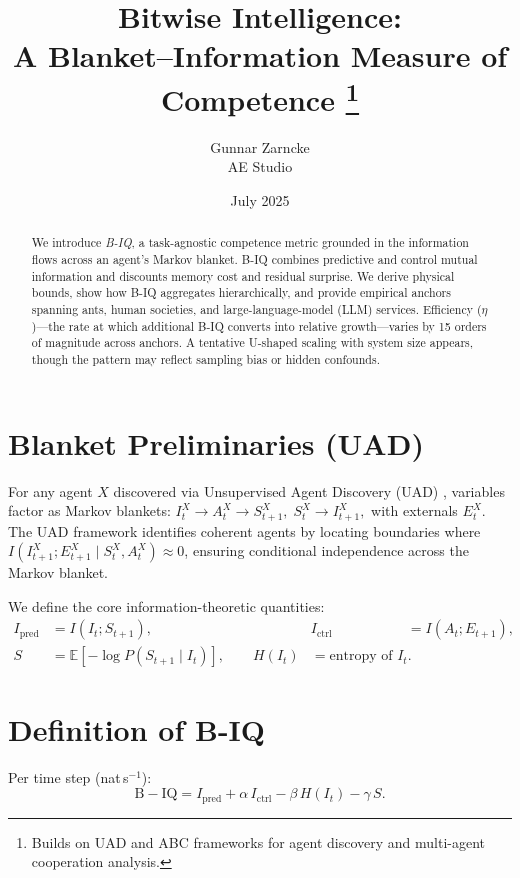 \documentclass[10pt,conference]{IEEEtran}
\title{Bitwise Intelligence:\\A Blanket–Information Measure of Competence
\thanks{\hspace{1em}Builds on UAD \cite{uad2025} and ABC \cite{abc2025} frameworks for agent discovery and multi-agent cooperation analysis.}}
\author{Gunnar Zarncke\\
AE Studio}
\date{July 2025}
\begin{document}
\maketitle

\begin{abstract}
We introduce \emph{B-IQ}, a task-agnostic competence metric grounded in the information flows across an agent's Markov blanket.  
B-IQ combines predictive and control mutual information and discounts memory cost and residual surprise.  
We derive physical bounds, show how B-IQ aggregates hierarchically, and provide empirical anchors spanning ants, human societies, and large-language-model (LLM) services.  
Efficiency (\(\eta\))—the rate at which additional B-IQ converts into relative growth—varies by 15 orders of magnitude across anchors.  
A tentative U-shaped scaling with system size appears, though the pattern may reflect sampling bias or hidden confounds.
\end{abstract}

\section{Blanket Preliminaries (UAD)}
For any agent \(X\) discovered via Unsupervised Agent Discovery (UAD) \cite{uad2025}, variables factor as Markov blankets:
\(
I^X_t\!\to\!A^X_t\!\to\!S^X_{t+1},
\;
S_t^X\!\to\!I^X_{t+1},
\)
with externals \(E^X_t\). The UAD framework identifies coherent agents by locating boundaries where \(I(I^X_{t+1};E^X_{t+1}\mid S^X_t,A^X_t) \approx 0\), ensuring conditional independence across the Markov blanket.

We define the core information-theoretic quantities:
\begin{align}
I_{\mathrm{pred}} &= I(I_t;S_{t+1}), &
I_{\mathrm{ctrl}} &= I(A_t;E_{t+1}),\nonumber\\
S &= \mathbb E[-\!\log P(S_{t+1}\!\mid I_t)],\qquad
H(I_t)&=\text{entropy of }I_t.
\end{align}

\section{Definition of B-IQ}
\label{sec:def}
Per time step (nat\,s\(^{-1}\)):
\begin{equation}
\boxed{
\mathrm{B\!-\!IQ}
= I_{\mathrm{pred}}
+ \alpha\,I_{\mathrm{ctrl}}
- \beta\,H(I_t)
- \gamma\,S.
}
\end{equation}
\end{document}
